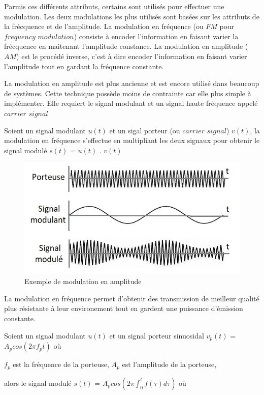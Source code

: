 \documentclass[12pt,a4paper,oneside, titlepage]{report}
\begin{document}
Parmis ces différents attributs, certains sont utilisés pour effectuer une modulation. Les deux modulations les plus utilisés sont basées sur les attributs de la frécquence et de l'amplitude. La modulation en fréquence (ou $FM$ pour $frequency$ $modulation$) consiste à encoder l'information en faisant varier la frécquence en maitenant l'amplitude constance. La modulation en amplitude ($AM$) est le procédé inverse, c'est à dire encoder l'information en faisant varier l'amplitude tout en gardant la fréquence constante. 


La modulation en amplitude est plus ancienne et est encore utilisé dans beaucoup de systèmes. Cette technique possède moins de contrainte car elle plus simple à implémenter. Elle requiert le signal modulant et un signal haute fréquence appelé $carrier$  $signal$

Soient un signal modulant $u(t)$ et un sigal porteur (ou $carrier$ $signal$) $v(t)$, la modulation en fréquence s'effectue en multipliant les deux signaux pour obtenir le signal modulé $s(t)$ = $u(t)$ . $v(t)$

\begin{figure}[h]
\centering

\includegraphics[scale=1]{../images/AM_mod.PNG}
\caption{Exemple de modulation en amplitude}\label{term4}
\end{figure}


La modulation en fréquence permet d'obtenir des transmission de meilleur qualité plus résistante à leur environement tout en gardent une puissance d'émission constante. 

Soient un signal modulant $u(t)$ et un signal porteur sinuosidal $v_{p}(t)$ = $A_{p}cos(2\pi f_{p}t)$ où

$f_{p}$ est la fréquence de la porteuse,
$A_{p}$ est l'amplitude de la porteuse,

alors le signal modulé $s(t)$ = $A_{p}cos(2\pi \int_{0}^{t}f(\tau)d\tau)$ où
\end{document}
